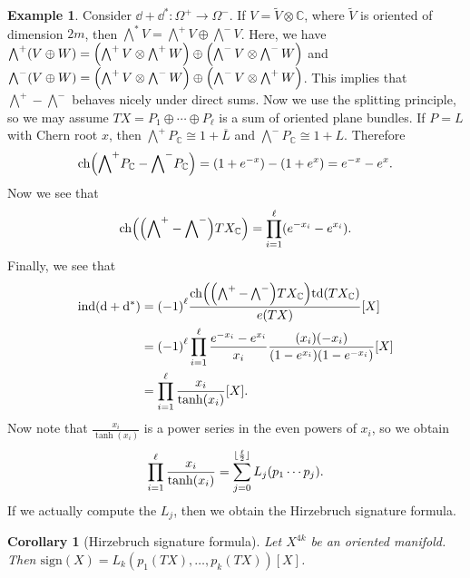 \documentclass[leqno, openany]{memoir}
\DeclarePairedDelimiter{\floor}{\lfloor}{\rfloor}
\newtheorem{cor}[thm]{Corollary}
\theoremstyle{definition}
\newtheorem{exm}[thm]{Example}
\theoremstyle{remark}
\theoremstyle{plain}
\theoremstyle{definition}
\theoremstyle{remark}
\newcommand{\C}{\mathbb{C}}
\newcommand{\mr}[1]{\mathrm{#1}}
\newcommand{\ol}[1]{\overline{#1}}
\newcommand{\wt}[1]{\widetilde{#1}}
\DeclareMathOperator{\ind}{ind}
\begin{document}
\begin{exm} Consider $\dd + \dd^* \colon \Omega^+ \to \Omega^-$. If $V = \wt{V}
    \otimes \C$, where $\wt{V}$ is oriented of dimension $2m$, then
    $\bigwedge^* V = \bigwedge^+ V \oplus \bigwedge^- V$. Here, we have
    $\bigwedge^+(V \oplus W) = \qty(\bigwedge^+ V \otimes \bigwedge^+ W) \oplus
    \qty(\bigwedge^- V \otimes \bigwedge^- W)$ and $\bigwedge^-(V \oplus W) =
    \qty(\bigwedge^+ V \otimes \bigwedge^- W) \oplus \qty(\bigwedge^- V \otimes
    \bigwedge^+ W)$. This implies that $\bigwedge^+ - \bigwedge^-$ behaves
    nicely under direct sums. Now we use the splitting principle, so we may
    assume $TX = P_1 \oplus \cdots \oplus P_{\ell}$ is a sum of oriented plane
    bundles. If $P = L$ with Chern root $x$, then $\bigwedge^+ P_{\C} \cong 1 +
    \ol{L}$ and $\bigwedge^- P_{\C} \cong 1 + L$. Therefore \[
        \mr{ch}\qty({\bigwedge}^+ P_{\C} - {\bigwedge}^- P_{\C}) = (1+e^{-x}) -
        (1+e^x) = e^{-x} - e^x. \] Now we see that \[ \mr{ch}
    \qty(\qty({\bigwedge}^+ - {\bigwedge}^-) TX_{\C}) = \prod_{i=1}^{\ell}
(e^{-x_i} - e^{x_i}). \] Finally, we see that \begin{align*} \ind(\dd + \dd^*)
&= {(-1)}^{\ell} \frac{\mr{ch}\qty(\qty(\bigwedge^+ - \bigwedge^-) TX_{\C})
\mr{td}(TX_{\C})}{e(TX)} [X] \\ &= {(-1)}^{\ell} \prod_{i=1}^{\ell}
\frac{e^{-x_i} - e^{x_i}}{x_i} \frac{(x_i)(-x_i)}{(1-e^{x_i})(1-e^{-x_i})} [X]
\\ &= \prod_{i=1}^{\ell} \frac{x_i}{\tanh(x_i)} [X].  \end{align*} Now note
that $\frac{x_i}{\tanh(x_i)}$ is a power series in the even powers of $x_i$, so
we obtain \[ \prod_{i=1}^{\ell} \frac{x_i}{\tanh(x_i)} =
\sum_{j=0}^{\floor{\frac{\ell}{2}}} L_j(p_1 \cdots p_j). \] If we actually
compute the $L_j$, then we obtain the Hirzebruch signature formula.  \end{exm}

\begin{cor}[Hirzebruch signature formula] Let $X^{4k}$ be an oriented manifold.
Then $\mr{sign}(X) = L_k(p_1(TX), \ldots, p_k(TX))[X]$.  \end{cor}
\end{document}
